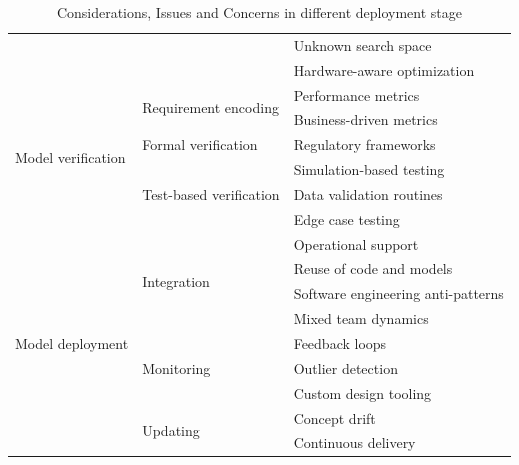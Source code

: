 \begin{table}[H]
\begin{tabular}{|l|l|l|}
                  &                                     &  Unknown search space\\ 
                  &                                     &  Hardware-aware optimization\\ \hline
\multirow{6}{*}{Model verification} & \multirow{2}{*}{Requirement encoding} & Performance metrics \\
                  &                                     & Business-driven metrics\\ \cline{2-3} 
                  &                 Formal verification &  Regulatory frameworks\\ \cline{2-3} 
                  & \multirow{3}{*}{Test-based verification} &  Simulation-based testing\\ 
                  &                                     &  Data validation routines\\ 
                  &                                     &  Edge case testing\\ \hline
\multirow{9}{*}{Model deployment} & \multirow{4}{*}{Integration} &  Operational support\\ 
                  &                   &  Reuse of code and models\\ 
                  &                   &  Software engineering anti-patterns\\ 
                  &                   &  Mixed team dynamics\\ \cline{2-3} 
                  & \multirow{3}{*}{Monitoring} & Feedback loops  \\ 
                  &                   &  Outlier detection\\
                  &                   &  Custom design tooling\\ \cline{2-3} 
                  & \multirow{2}{*}{Updating} & Concept drift  \\
                  &                   &  Continuous delivery\\ \hline
\end{tabular}
\caption{Considerations, Issues and Concerns in different deployment stage \cite{paleyes2022challenges}}
\label{tab:deployment_stages}
\end{table}


